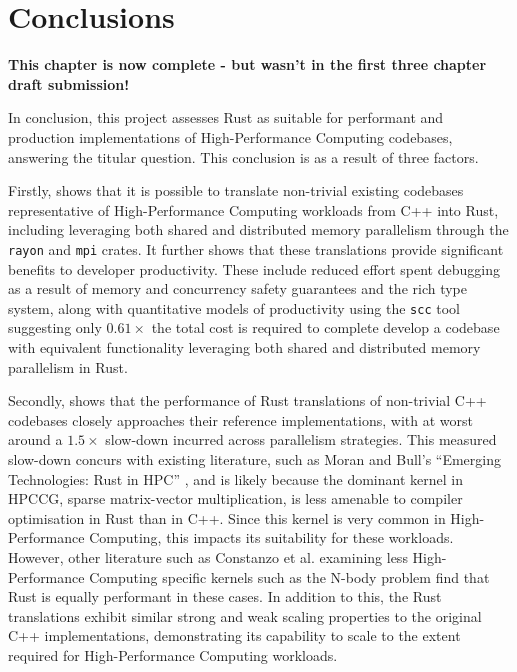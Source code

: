 \chapter{Conclusions}
\label{ch:conclusions}

\textbf{This chapter is now complete - but wasn't in the first three chapter draft submission!}

In conclusion, this project assesses Rust as suitable for performant and production implementations of High-Performance Computing codebases, answering the titular question. This conclusion is as a result of three factors.

Firstly,  shows that it is possible to translate non-trivial existing codebases representative of High-Performance Computing workloads from C++ into Rust, including leveraging both shared and distributed memory parallelism through the \texttt{rayon} and \texttt{mpi} crates. It further shows that these translations provide significant benefits to developer productivity. These include reduced effort spent debugging as a result of memory and concurrency safety guarantees and the rich type system, along with quantitative models of productivity using the \texttt{scc} tool suggesting only $0.61 \times$ the total cost is required to complete develop a codebase with equivalent functionality leveraging both shared and distributed memory parallelism in Rust.

Secondly,  shows that the performance of Rust translations of non-trivial C++ codebases closely approaches their reference implementations, with at worst around a $1.5 \times$ slow-down incurred across parallelism strategies. This measured slow-down concurs with existing literature, such as Moran and Bull's ``Emerging Technologies: Rust in HPC'' \cite{moranEmergingTechnologiesRust2023}, and is likely because the dominant kernel in HPCCG, sparse matrix-vector multiplication, is less amenable to compiler optimisation in Rust than in C++. Since this kernel is very common in High-Performance Computing, this impacts its suitability for these workloads. However, other literature such as Constanzo et al. \cite{costanzoPerformanceVsProgramming2021} examining less High-Performance Computing specific kernels such as the N-body problem find that Rust is equally performant in these cases. In addition to this, the Rust translations exhibit similar strong and weak scaling properties to the original C++ implementations, demonstrating its capability to scale to the extent required for High-Performance Computing workloads.

